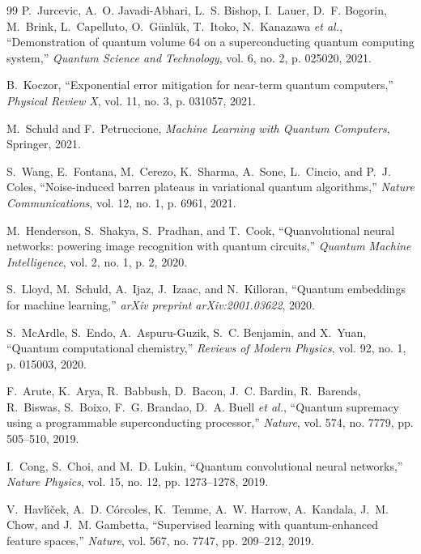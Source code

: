 \documentclass[journal]{IEEEtran}
\begin{document}
\begin{thebibliography}{99}
P.~Jurcevic, A.~O. Javadi-Abhari, L.~S. Bishop, I.~Lauer, D.~F. Bogorin, M.~Brink, L.~Capelluto, O.~G{\"u}nl{\"u}k, T.~Itoko, N.~Kanazawa \emph{et al.},
``Demonstration of quantum volume 64 on a superconducting quantum computing system,'' \emph{Quantum Science and Technology}, vol. 6, no. 2, p. 025020, 2021.

B.~Koczor,
``Exponential error mitigation for near-term quantum computers,'' \emph{Physical Review X}, vol. 11, no. 3, p. 031057, 2021.

M.~Schuld and F.~Petruccione,
\emph{Machine Learning with Quantum Computers}, Springer, 2021.

S.~Wang, E.~Fontana, M.~Cerezo, K.~Sharma, A.~Sone, L.~Cincio, and P.~J. Coles,
``Noise-induced barren plateaus in variational quantum algorithms,'' \emph{Nature Communications}, vol. 12, no. 1, p. 6961, 2021.

M.~Henderson, S.~Shakya, S.~Pradhan, and T.~Cook,
``Quanvolutional neural networks: powering image recognition with quantum circuits,'' \emph{Quantum Machine Intelligence}, vol. 2, no. 1, p. 2, 2020.

S.~Lloyd, M.~Schuld, A.~Ijaz, J.~Izaac, and N.~Killoran,
``Quantum embeddings for machine learning,'' \emph{arXiv preprint arXiv:2001.03622}, 2020.

S.~McArdle, S.~Endo, A.~Aspuru-Guzik, S.~C. Benjamin, and X.~Yuan,
``Quantum computational chemistry,'' \emph{Reviews of Modern Physics}, vol. 92, no. 1, p. 015003, 2020.

F.~Arute, K.~Arya, R.~Babbush, D.~Bacon, J.~C. Bardin, R.~Barends, R.~Biswas, S.~Boixo, F.~G. Brandao, D.~A. Buell \emph{et al.},
``Quantum supremacy using a programmable superconducting processor,'' \emph{Nature}, vol. 574, no. 7779, pp. 505--510, 2019.

I.~Cong, S.~Choi, and M.~D. Lukin,
``Quantum convolutional neural networks,'' \emph{Nature Physics}, vol. 15, no. 12, pp. 1273--1278, 2019.

V.~Havl{\'\i}{\v{c}}ek, A.~D. C{\'o}rcoles, K.~Temme, A.~W. Harrow, A.~Kandala, J.~M. Chow, and J.~M. Gambetta,
``Supervised learning with quantum-enhanced feature spaces,'' \emph{Nature}, vol. 567, no. 7747, pp. 209--212, 2019.


\end{thebibliography}
\end{document}
